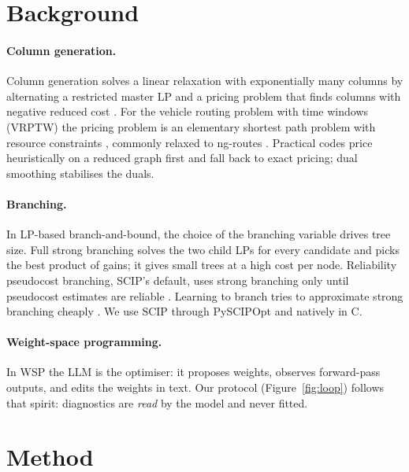 \documentclass[11pt]{article}
\begin{document}
\section{Background}

\paragraph{Column generation.} Column generation solves a linear relaxation with exponentially
many columns by alternating a restricted master LP and a pricing problem that finds columns with
negative reduced cost \citep{lubbecke2005,desaulniers2005}. For the vehicle routing problem with
time windows (VRPTW) the pricing problem is an elementary shortest path problem with resource
constraints \citep{desrochers1992}, commonly relaxed to ng-routes \citep{baldacci2011}. Practical
codes price heuristically on a reduced graph first and fall back to exact pricing; dual smoothing
\citep{wentges1997} stabilises the duals.

\paragraph{Branching.} In LP-based branch-and-bound, the choice of the branching variable drives
tree size. Full strong branching solves the two child LPs for every candidate and picks the best
product of gains; it gives small trees at a high cost per node. Reliability pseudocost branching,
SCIP's default, uses strong branching only until pseudocost estimates are reliable
\citep{achterberg2005,achterberg2007}. Learning to branch tries to approximate strong branching
cheaply \citep{khalil2016,alvarez2017,gasse2019}. We use SCIP \citep{achterberg2009,scip10} through
PySCIPOpt \citep{pyscipopt} and natively in C.

\paragraph{Weight-space programming.} In WSP \citep{wsp} the LLM is the optimiser: it proposes
weights, observes forward-pass outputs, and edits the weights in text. Our protocol (Figure~\ref{fig:loop})
follows that spirit: diagnostics are \emph{read} by the model and never fitted.

\section{Method}
\end{document}
